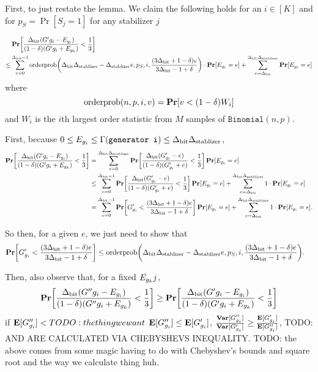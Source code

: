 \newcommand{\orderpinner}{\DegBit\DegStable - \DegStable e, p_S, i, \frac{(3\DegBit + 1 - \delta) e}{3\DegBit -1 + \delta}}

First, to just restate the lemma.
We claim the following holds for an $i \in [K]$ and for $p_S = \Pr[S_j = 1]$ for any stabilizer $j$
	
\begin{align*}
	&\Pr\mleft[\OptVarEq < \frac{1}{3}\mright] \\
	\leq &\sum_{e = 0}^{\DegBit - 1} 
			\OrderP\mleft(\orderpinner\mright) \cdot \Pr[E_{g_i} = e] 
			+ \sum_{e = \DegBit}^{\DegBit\DegStable}\Pr[E_{g_i} = e]
\end{align*}
where
$$
	\OrderP(n, p, i, v) = \Pr\mleft[v < (1 - \delta) W_i \mright]
$$
and $W_i$ is the $i$th largest order statistic from $M$ samples of $\texttt{Binomial}(n, p)$.


First, because $0 \leq E_{g_i} \leq \Gamma(\texttt{generator i}) \leq {\Delta_{\text{bit}}} {\Delta_{\text{stablizer}}}$, 
\begin{align*}
\Pr\mleft[\OptVarEq < \frac{1}{3}\mright] &= 
	\sum_{e = 0}^{\DegBit \DegStable} 
		\Pr\mleft[\frac{\DegBit(G'_{g_i} - e)}{(1 - \delta)(G'_{g_i} + e)} < \frac{1}{3} \mright] \Pr\mleft[E_{g_i} = e\mright]\\
&\leq
	\sum_{e = 0}^{\DegBit - 1} 
		\Pr\mleft[\frac{\DegBit(G'_{g_i} - e)}{(1 - \delta)(G'_{g_i} + e)} < \frac{1}{3} \mright] \Pr\mleft[E_{g_i} = e\mright]
	+ \sum_{e = \DegBit}^{\DegBit \DegStable} 1 \cdot \Pr\mleft[E_{g_i} = e\mright]\\
&=
	\sum_{e = 0}^{\DegBit - 1} 
		\Pr\mleft[G'_{g_i} < \frac{(3 \DegBit + 1 - \delta) e}{3 \DegBit - 1 + \delta} \mright] \Pr\mleft[E_{g_i} = e\mright]
	+ \sum_{e = \DegBit}^{\DegBit \DegStable} 1 \cdot \Pr\mleft[E_{g_i} = e\mright].\\
\end{align*}

So then, for a given $e$,
we just need to show that
\begin{align*}
	\Pr\mleft[G'_{g_i} < \frac{(3 \DegBit + 1 - \delta) e}{3 \DegBit - 1 + \delta} \mright] 
&\leq
	\OrderP\mleft(\orderpinner\mright).
\end{align*}

Then, also observe that, for a fixed $E_{g_k}j$, 
$$
	\Pr\mleft[\OptVarEqChangeable{G''} < \frac{1}{3}\mright] \geq \Pr\mleft[\OptVarEq < \frac{1}{3}\mright]
$$
if $\operatorname*{\mathbf{E}}[G''_{g_i}] < TODO: the thing we want$ $\operatorname*{\mathbf{E}}[G''_{g_i}] \leq \operatorname*{\mathbf{E}}[G'_{g_i}]$, 
$\frac{\operatorname*{\mathbf{Var}}[G''_{g_i}]}{\operatorname*{\mathbf{Var}}[G'_{g_i}]} \geq \frac{\operatorname*{\mathbf{E}}[G'_{g_i}]}{\operatorname*{\mathbf{E}}[G''_{g_i}]}$,
TODO: AND ARE CALCULATED VIA CHEBYSHEVS INEQUALITY.
TODO: the above comes from some magic having to do with Chebyshev's bounds and square root
and the way we calculate thing huh. 

